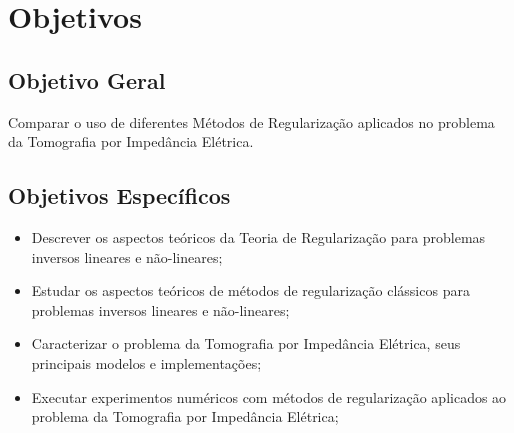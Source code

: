 \chapter{Objetivos}
\section{Objetivo Geral}
	Comparar o uso de diferentes Métodos de Regularização aplicados no problema da Tomografia por Impedância Elétrica.
 
\section{Objetivos Específicos}

\begin{itemize}
    \item Descrever os aspectos teóricos da Teoria de Regularização para problemas inversos lineares e não-lineares;
    \item Estudar os aspectos teóricos de métodos de regularização clássicos para problemas inversos lineares e não-lineares;
    \item Caracterizar o problema da Tomografia por Impedância Elétrica, seus principais modelos e implementações;
    \item Executar experimentos numéricos com métodos de regularização aplicados ao problema da Tomografia por Impedância Elétrica;
\end{itemize}